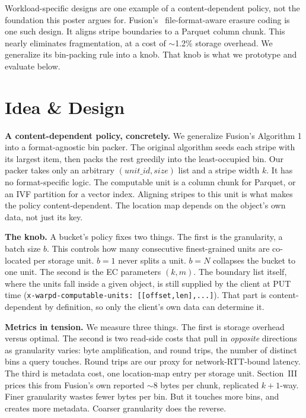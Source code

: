 \documentclass[10pt,conference]{IEEEtran}
\begin{document}
Workload-specific designs are one example of a content-dependent policy,
not the foundation this poster argues for. Fusion's~\cite{fusion2025}
file-format-aware erasure coding is one such design. It aligns stripe
boundaries to a Parquet column chunk. This nearly eliminates fragmentation,
at a cost of $\sim$1.2\% storage overhead. We generalize its bin-packing
rule into a knob. That knob is what we prototype and evaluate below.

\section{Idea \& Design}

\textbf{A content-dependent policy, concretely.} We generalize Fusion's
Algorithm 1 into a format-agnostic bin packer. The original algorithm seeds
each stripe with its largest item, then packs the rest greedily into the
least-occupied bin. Our packer takes only an arbitrary
$(\mathit{unit\_id}, \mathit{size})$ list and a stripe width $k$. It has no
format-specific logic. The computable unit is a column chunk for Parquet,
or an IVF partition for a vector index. Aligning stripes to this unit is
what makes the policy content-dependent. The location map depends on the
object's own data, not just its key.

\textbf{The knob.} A bucket's policy fixes two things. The first is the
granularity, a batch size $b$. This controls how many consecutive
finest-grained units are co-located per storage unit. $b{=}1$ never splits
a unit. $b{=}N$ collapses the bucket to one unit. The second is the EC
parameters $(k, m)$. The boundary list itself, where the units fall inside
a given object, is still supplied by the client at PUT time
(\texttt{x-warpd-computable-units: [[offset,len],...]}). That part is
content-dependent by definition, so only the client's own data can
determine it.

\textbf{Metrics in tension.} We measure three things. The first is storage
overhead versus optimal. The second is two read-side costs that pull in
\emph{opposite} directions as granularity varies: byte amplification, and
round trips, the number of distinct bins a query touches. Round trips are
our proxy for network-RTT-bound latency. The third is metadata cost, one
location-map entry per storage unit. Section~III prices this from Fusion's
own reported $\sim$8 bytes per chunk, replicated $k{+}1$-way. Finer
granularity wastes fewer bytes per bin. But it touches more bins, and
creates more metadata. Coarser granularity does the reverse.
\end{document}
